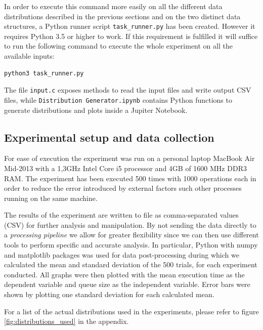 \documentclass{article}
\begin{document}
In order to execute this command more easily on all the different data distributions described in the previous sections and on the two distinct data structures, a Python runner script \texttt{task\_runner.py} has been created. However it requires Python 3.5 or higher to work. If this requirement is fulfilled it will suffice to run the following command to execute the whole experiment on all the available inputs:

\begin{verbatim}
python3 task_runner.py 
\end{verbatim}

The file \texttt{input.c} exposes methods to read the input files and write output CSV files, while \texttt{Distribution Generator.ipynb} contains Python functions to generate distributions and plots inside a Jupiter Notebook.

\subsection{Experimental setup and data collection}
For ease of execution the experiment was run on a personal laptop MacBook Air Mid-2013 with a 1,3GHz Intel Core i5 processor and 4GB of 1600 MHz DDR3 RAM. The experiment has been executed 500 times with 1000 operations each in order to reduce the error introduced by external factors such other processes running on the same machine.

The results of the experiment are written to file as comma-separated values (CSV) for further analysis and manipulation. By not sending the data directly to a \textit{processing pipeline} we allow for greater flexibility since we can then use different tools to perform specific and accurate analysis. In particular, Python with numpy and matplotlib packages was used for data post-processing during which we calculated the mean and standard deviation of the 500 trials, for each experiment conducted. All graphs were then plotted with the mean execution time as the dependent variable and queue size as the independent variable. Error bars were shown by plotting one standard deviation for each calculated mean.

For a list of the actual distributions used in the experiments, please refer to figure \ref{fig:distributions_used} in the appendix.

\pagebreak


\end{document}
